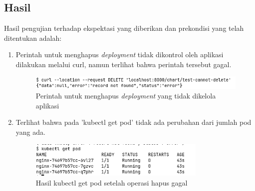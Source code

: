 \subsection{Hasil}
Hasil pengujian terhadap ekspektasi yang diberikan dan prekondisi yang telah ditentukan adalah:
\begin{enumerate}
    \item Perintah untuk menghapus \textit{deployment} tidak dikontrol oleh aplikasi dilakukan melalui curl, namun terlihat bahwa perintah tersebut gagal.
    \begin{figure}
    	\centering
    	\includegraphics[width=1\textwidth]{pics/5.9.curl.png}
    	\caption{Perintah untuk menghapus \textit{deployment} yang tidak dikelola aplikasi}
    	\label{fig:deleteDeploymentFail}
    \end{figure}
    \item Terlihat bahwa pada 'kubectl get pod' tidak ada perubahan dari jumlah pod yang ada.
    \begin{figure}
    	\centering
    	\includegraphics[width=0.8\textwidth]{pics/5.9.getPod.png}
    	\caption{Hasil kubectl get pod setelah operasi hapus gagal}
    	\label{fig:getPodFail}
    \end{figure}
\end{enumerate}